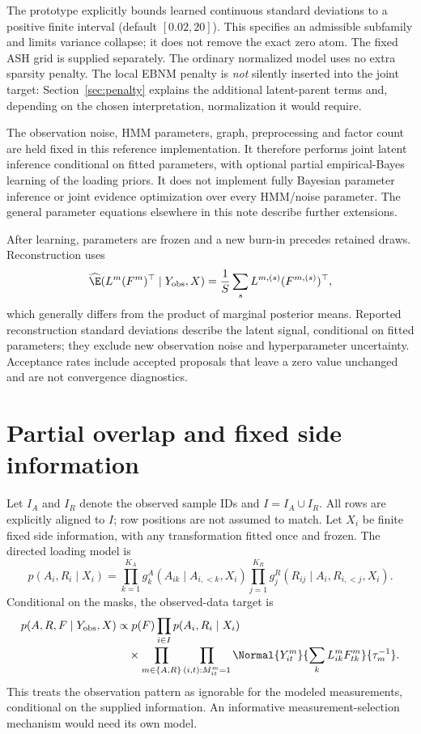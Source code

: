 The prototype explicitly bounds learned continuous standard deviations
to a positive finite interval (default \([0.02,20]\)). This specifies an
admissible subfamily and limits variance collapse; it does not remove
the exact zero atom. The fixed ASH grid is supplied separately.
The ordinary normalized model uses no extra sparsity penalty. The local
EBNM penalty is \emph{not} silently inserted into the joint target:
Section~\ref{sec:penalty} explains the additional latent-parent terms and,
depending on the chosen interpretation, normalization it would require.

The observation noise, HMM parameters, graph, preprocessing and factor
count are held fixed in this reference implementation. It therefore
performs joint latent inference conditional on fitted parameters, with
optional partial empirical-Bayes learning of the loading priors. It does
not implement fully Bayesian parameter inference or joint evidence
optimization over every HMM/noise parameter. The general parameter
equations elsewhere in this note describe further extensions.

After learning, parameters are frozen and a new burn-in precedes retained
draws. Reconstruction uses
\[
\widehat{\E}(L^m(F^m)^\top\mid Y_{\rm obs},X)
=\frac1S\sum_sL^{m,(s)}(F^{m,(s)})^\top,
\]
which generally differs from the product of marginal posterior means.
Reported reconstruction standard deviations describe the latent signal,
conditional on fitted parameters; they exclude new observation noise and
hyperparameter uncertainty. Acceptance rates include accepted proposals
that leave a zero value unchanged and are not convergence diagnostics.

\section{Partial overlap and fixed side information}
\label{sec:partialoverlap}
Let \(I_A\) and \(I_R\) denote the observed sample IDs and
\(I=I_A\cup I_R\). All rows are explicitly aligned to \(I\); row positions
are not assumed to match. Let \(X_i\) be finite fixed side information,
with any transformation fitted once and frozen. The directed loading
model is
\begin{equation}
p(A_i,R_i\mid X_i)=
\prod_{k=1}^{K_A}g^A_k(A_{ik}\mid A_{i,<k},X_i)
\prod_{j=1}^{K_R}g^R_j(R_{ij}\mid A_i,R_{i,<j},X_i).
\end{equation}
Conditional on the masks, the observed-data target is
\begin{align}
p(A,R,F\mid Y_{\rm obs},X)
&\propto p(F)\prod_{i\in I}p(A_i,R_i\mid X_i)\nonumber\\[-2pt]
&\quad{}\times\prod_{m\in\{A,R\}}\prod_{(i,t):M^m_{it}=1}
\Normal{Y^m_{it}}{\sum_kL^m_{ik}F^m_{tk}}{\tau_m^{-1}}.
\label{eq:partialtarget}
\end{align}
This treats the observation pattern as ignorable for the modeled
measurements, conditional on the supplied information. An informative
measurement-selection mechanism would need its own model.

